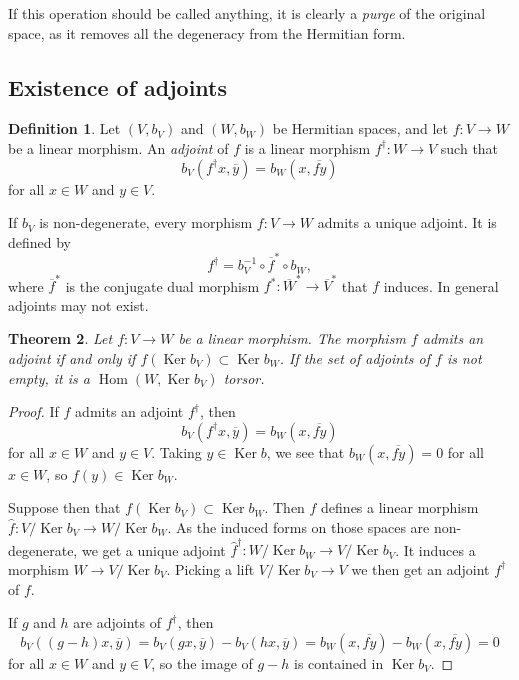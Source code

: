 \documentclass[10pt,a4paper]{amsart}
\newtheorem{theo}{Theorem}[section]
\theoremstyle{definition}
\newtheorem{defi}[theo]{Definition}
\def\ov#1{\overline{#1}}
\DeclareMathOperator{\Ker}{Ker}
\DeclareMathOperator{\Hom}{Hom}
\begin{document}
If this operation should be called anything, it is clearly a \emph{purge} of the original space, as it removes all the degeneracy from the Hermitian form.



\subsection*{Existence of adjoints}
\label{sec:existence-adjoints}




\begin{defi}
Let $(V, b_V)$ and $(W, b_W)$ be Hermitian spaces, and let $f : V \to W$ be a linear morphism. An \emph{adjoint} of $f$ is a linear morphism $f^\dagger : W \to V$ such that
\[
b_V(f^\dagger x, \ov y)
= b_W(x, \ov{f y})
\]
for all $x \in W$ and $y \in V$.
\end{defi}


If $b_V$ is non-degenerate, every morphism $f : V \to W$ admits a unique adjoint. It is defined by
\[
f^\dagger = b_V^{-1} \circ \ov f^* \circ b_W,
\]
where $\ov f^*$ is the conjugate dual morphism $f^* : \ov W^* \to \ov V^*$ that $f$ induces. In general adjoints may not exist.


\begin{theo}
Let $f : V \to W$ be a linear morphism. The morphism $f$ admits an adjoint if and only if $f(\Ker b_V) \subset \Ker b_W$. If the set of adjoints of $f$ is not empty, it is a $\Hom(W, \Ker b_V)$ torsor.
\end{theo}

\begin{proof}
If $f$ admits an adjoint $f^\dagger$, then
\[
b_V(f^\dagger x, \ov y)
= b_W(x, \ov{fy})
\]
for all $x \in W$ and $y \in V$. Taking $y \in \Ker b$, we see that $b_W(x, \ov{fy}) = 0$ for all $x \in W$, so $f(y) \in \Ker b_W$.

Suppose then that $f(\Ker b_V) \subset \Ker b_W$. Then $f$ defines a linear morphism $\hat f : V / \Ker b_V \to W / \Ker b_W$. As the induced forms on those spaces are non-degenerate, we get a unique adjoint $\hat f^\dagger : W / \Ker b_W \to V / \Ker b_V$. It induces a morphism $W \to V / \Ker b_V$. Picking a lift $V / \Ker b_V \to V$ we then get an adjoint $f^\dagger$ of $f$.

If $g$ and $h$ are adjoints of $f^\dagger$, then
\[
b_V((g - h)x, \ov y)
= b_V(gx, \ov y) - b_V(hx, \ov y)
= b_W(x, \ov{fy}) - b_W(x, \ov{fy})
= 0
\]
for all $x \in W$ and $y \in V$, so the image of $g - h$ is contained in $\Ker b_V$.
\end{proof}
\end{document}
